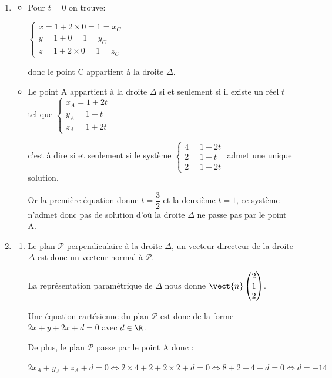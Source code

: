 	\begin{enumerate}
		\item \begin{itemize} \item Pour $t=0$ on trouve: 

			$\begin{cases}  x= 1+2\times 0 =1 =x_C \\ y=1 +0 =1=y_C\\ z=1 +2\times 0 =1=z_C \end{cases}$ 

			donc le point C appartient à la droite $\Delta$. 

			\item Le point A appartient à la droite $\Delta$  si et seulement si il existe un réel $t$ tel que $\begin{cases} x_A=1+2t \\ y_A=1+t \\ z_A=1+2t \end{cases} $ 

c'est à dire si et seulement si le système  $\begin{cases} 4=1+2t \\ 2=1+t \\ 2=1+2t \end{cases}$ admet une unique solution.

Or la première équation donne $t=\dfrac{3}{2}$ et la deuxième $t=1$, ce système n'admet donc pas de solution d'où la droite $\Delta$ ne passe pas par le point A.
		\end{itemize} 
		\item
		\begin{enumerate}
			\item Le plan $\mathcal{P}$  perpendiculaire à la droite $\Delta$, un vecteur directeur de la droite $\Delta$ est donc un vecteur normal à $\mathcal{P}$. 
			
			La représentation paramétrique de $\Delta$ nous  donne $\vect{n}\begin{pmatrix} 2 \\1\\2 \end{pmatrix}$. 
			
			Une équation cartésienne du plan $\mathcal{P}$ est donc de la forme $2x+y+2x+d=0$ avec $d\in \R$. 
			
			De plus, le plan $\mathcal{P}$ passe  par le point A donc : 
			
			$2x_A+y_A+z_A+d=0 \Longleftrightarrow 2 \times 4 +2 +2 \times 2 +d=0 \Longleftrightarrow 8 +2 +4 +d=0 \Longleftrightarrow d=-14$


\end{enumerate}
\end{enumerate}
